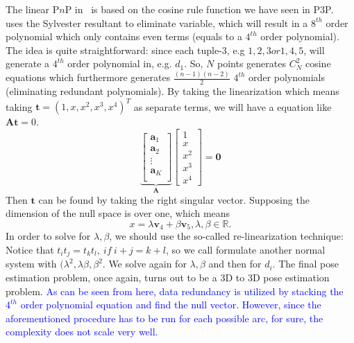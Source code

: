\documentclass[a4paper]{report}
\begin{document}
The linear P$n$P in~\cite{quan1999linear} is based on the cosine rule function we have seen in P$3$P.~\cite{quan1999linear} uses the Sylvester resultant to eliminate variable, which will result in a $8^{th}$ order polynomial which only contains even terms (equals to a $4^{th}$ order polynomial). The idea is quite straightforward: since each tuple-3, e.g ${1,2,3} or {1,4,5}$, will generate a $4^{th}$ order polynomial in, e.g. $d_1$. So, $N$ points generates $C_{N}^{2}$ cosine equations which furthermore generates $\frac{(n-1)(n-2)}{2}$ $4^{th}$ order polynomials (eliminating redundant polynomials). By taking the linearization which means taking $\mathbf{t}=(1,x,x^2,x^3,x^4)^{T}$ as separate terms, we will have a equation like $\mathbf{A}\mathbf{t}=0$. 
$$
\underbrace{
\left[
\begin{matrix}
\mathbf{a}_1 \\
\mathbf{a}_2 \\
\vdots \\
\mathbf{a}_K \\
\end{matrix}
\right]}_{\mathbf{A}}
\left[
\begin{matrix}
1 \\ x \\ x^2 \\ x^3 \\ x^4
\end{matrix}
\right]=\mathbf{0}
$$
Then $\mathbf{t}$ can be found by taking the right singular vector. Supposing the dimension of the null space is over one, which means 
$$
x = \lambda \mathbf{v}_4 + \beta \mathbf{v}_5, \lambda, \beta \in \mathbb{R}.
$$
In order to solve for $\lambda, \beta$, we should use the so-called re-linearization technique:
Notice that $t_it_j=t_kt_l,\ if\ i+j=k+l$, so we call formulate another normal system with $(\lambda^2, \lambda\beta, \beta^2$. We solve again for $\lambda, \beta$ and then for $d_i$. The final pose estimation problem, once again, turns out to be a $3$D to $3$D pose estimation problem. \textcolor{blue}{As can be seen from here, data redundancy is utilized by stacking the $4^{th}$ order polynomial equation and find the null vector. However, since the aforementioned procedure has to be run for each possible arc, for sure, the complexity does not scale very well.}
\end{document}
